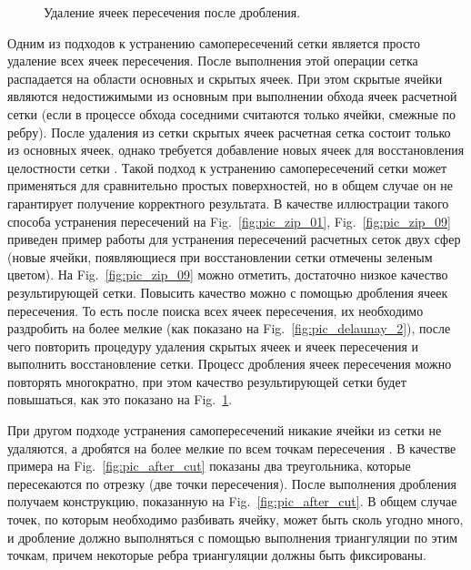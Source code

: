 \begin{figure}[h]
\begin{minipage}[h]{0.32\textwidth}
    \caption{Удаление ячеек пересечения после дробления.}\label{fig:pic_zip_15}
  \end{minipage}
\end{figure}

Одним из подходов к устранению самопересечений сетки является просто удаление всех ячеек пересечения.
После выполнения этой операции сетка распадается на области основных и скрытых ячеек.
При этом скрытые ячейки являются недостижимыми из основным при выполнении обхода ячеек расчетной сетки (если в процессе обхода соседними считаются только ячейки, смежные по ребру).
После удаления из сетки скрытых ячеек расчетная сетка состоит только из основных ячеек, однако требуется добавление новых ячеек для восстановления целостности сетки \cite{Charton}.
Такой подход к устранению самопересечений сетки может применяться для сравнительно простых поверхностей, но в общем случае он не гарантирует получение корректного результата.
В качестве иллюстрации такого способа устранения пересечений на Fig.~\ref{fig:pic_zip_01}, Fig.~\ref{fig:pic_zip_09} приведен пример работы для устранения пересечений расчетных сеток двух сфер (новые ячейки, появляющиеся при восстановлении сетки отмечены зеленым цветом).
На Fig.~\ref{fig:pic_zip_09} можно отметить, достаточно низкое качество результирующей сетки.
Повысить качество можно с помощью дробления ячеек пересечения.
То есть после поиска всех ячеек пересечения, их необходимо раздробить на более мелкие (как показано на Fig.~\ref{fig:pic_delaunay_2}), после чего повторить процедуру удаления скрытых ячеек и ячеек пересечения и выполнить восстановление сетки.
Процесс дробления ячеек пересечения можно повторять многократно, при этом качество результирующей сетки будет повышаться, как это показано на Fig.~\ref{fig:pic_zip_15}.

При другом подходе устранения самопересечений никакие ячейки из сетки не удаляются, а дробятся на более мелкие по всем точкам пересечения \cite{Skvorkovska}.
В качестве примера на Fig.~\ref{fig:pic_after_cut} показаны два треугольника, которые пересекаются по отрезку (две точки пересечения).
После выполнения дробления получаем конструкцию, показанную на Fig.~\ref{fig:pic_after_cut}.
В общем случае точек, по которым необходимо разбивать ячейку, может быть сколь угодно много, и дробление должно выполняться с помощью выполнения триангуляции по этим точкам, причем некоторые ребра триангуляции должны быть фиксированы.

